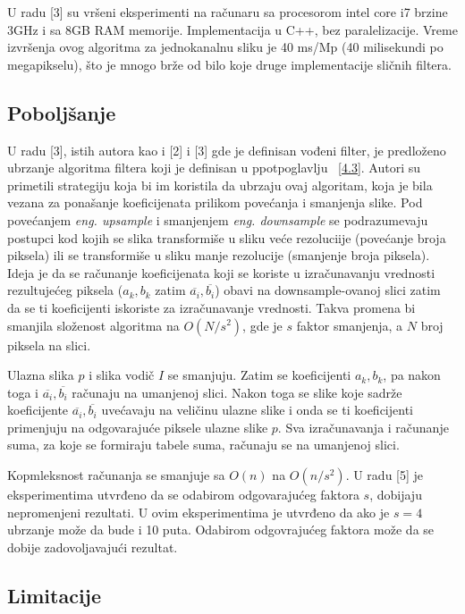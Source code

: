 \documentclass[a4paper,12pt,titlepage]{article}
\begin{document}
U radu [3] su vršeni eksperimenti na računaru sa procesorom intel core i7 brzine 3GHz i sa 8GB RAM memorije. Implementacija u C++, bez paralelizacije. Vreme izvršenja ovog algoritma za jednokanalnu sliku je 40 ms/Mp (40 milisekundi po megapikselu), što je mnogo brže od bilo koje druge implementacije sličnih filtera.  

\subsection{Poboljšanje}%

U radu [3], istih autora kao i [2] i [3] gde je definisan vođeni filter, je predloženo ubrzanje algoritma filtera koji je definisan u ppotpoglavlju ~\ref{4.3}. Autori su primetili strategiju koja bi im koristila da ubrzaju ovaj algoritam, koja je bila vezana za ponašanje koeficijenata prilikom povećanja i smanjenja slike. Pod povećanjem \emph{eng. upsample} i smanjenjem \emph{eng. downsample} se podrazumevaju postupci kod kojih se slika transformiše u sliku veće rezoluciije (povećanje broja piksela) ili se transformiše u sliku manje rezolucije (smanjenje broja piksela). Ideja je da se računanje koeficijenata koji se koriste u izračunavanju vrednosti rezultujećeg piksela ($a_k, b_k$ zatim $\overline{a_i}, \overline{b_i}$) obavi na downsample-ovanoj slici zatim da se ti koeficijenti iskoriste za izračunavanje vrednosti. Takva promena bi smanjila složenost algoritma na $O(N / s^2)$, gde je $s$ faktor smanjenja, a $N$ broj piksela na slici. 

Ulazna slika $p$ i slika vodič $I$ se smanjuju. Zatim se koeficijenti $a_k, b_k$, pa nakon toga i $\overline{a_i}, \overline{b_i}$ računaju na umanjenoj slici. Nakon toga se slike koje sadrže koeficijente $\overline{a_i}, \overline{b_i}$ uvećavaju na veličinu ulazne slike i onda se ti koeficijenti primenjuju na odgovarajuće piksele ulazne slike $p$. Sva izračunavanja i računanje suma, za koje se formiraju tabele suma, računaju se na umanjenoj slici.

Kopmleksnost računanja se smanjuje sa $O(n)$ na $O(n / s^2)$. U radu [5] je eksperimentima utvrđeno da se odabirom odgovarajućeg faktora $s$, dobijaju nepromenjeni rezultati. U ovim eksperimentima je utvrđeno da ako je $s = 4$ ubrzanje može da bude i 10 puta. Odabirom odgovrajućeg faktora može da se dobije zadovoljavajući rezultat.   

\subsection{Limitacije}%
\end{document}
